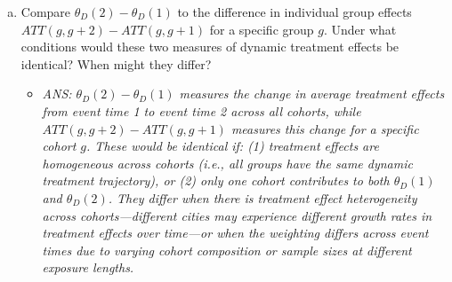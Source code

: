 \documentclass[12pt,a4paper]{article}
\newcommand{\ans}[1]{\begin{itemize}\item[$\bullet$] \textit{ANS: #1}\end{itemize}}
\begin{document}
\begin{enumerate}
\begin{enumerate}[(a)]
\item Compare $\theta_D(2)-\theta_D(1)$ to the difference in individual group effects $ATT(g, g+2) - ATT(g, g+1)$ for a specific group $g$. Under what conditions would these two measures of dynamic treatment effects be identical? When might they differ?
\ans{$\theta_D(2) - \theta_D(1)$ measures the change in average treatment effects from event time 1 to event time 2 across all cohorts, while $ATT(g, g+2) - ATT(g, g+1)$ measures this change for a specific cohort $g$. These would be identical if: (1) treatment effects are homogeneous across cohorts (i.e., all groups have the same dynamic treatment trajectory), or (2) only one cohort contributes to both $\theta_D(1)$ and $\theta_D(2)$. They differ when there is treatment effect heterogeneity across cohorts---different cities may experience different growth rates in treatment effects over time---or when the weighting differs across event times due to varying cohort composition or sample sizes at different exposure lengths.}
\end{enumerate}

\end{enumerate}
\end{document}
